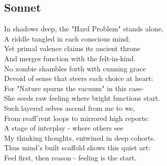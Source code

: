 \documentclass[12pt,letterpaper]{article}
\begin{document}
    \subsection{Sonnet}

    \begin{center}
    In shadows deep, the "Hard Problem" stands alone,\\
    A riddle tangled in each conscious mind;\\
    Yet primal valence claims its ancient throne\\
    And merges function with the felt-in-kind.\\
    No zombie shambles forth with cunning grace\\
    Devoid of sense that steers each choice at heart:\\
    For "Nature spurns the vacuum" in this case-\\
    She seeds raw feeling where bright functions start.\\
    Such layered selves ascend from me to we,\\
    From reaff'rent loops to mirrored high reports:\\
    A stage of interplay - where others see\\
    My thinking thoughts, entwined in deep cohorts.\\
    Thus mind's built scaffold shows this quiet art:\\
    Feel first, then reason - feeling is the start.
    \end{center}
\end{document}

